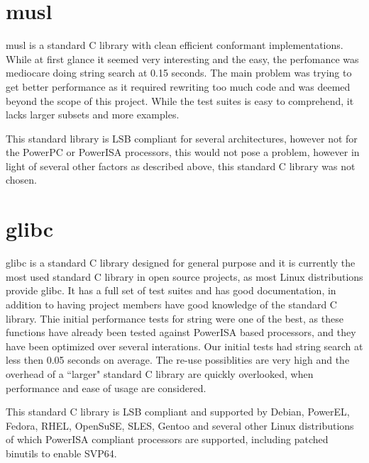 \section{musl}
\label{content:musl}

musl is a standard C library with clean efficient conformant implementations.
While at first glance it seemed very interesting and the easy, the perfomance was mediocare doing string search at 0.15 seconds.
The main problem was trying to get better performance as it required rewriting too much code and was deemed beyond the scope of this project.
While the test suites is easy to comprehend, it lacks larger subsets and more examples.
\par

This standard library is \acrshort{LSB} compliant for several architectures, however not for the PowerPC or PowerISA processors,
this would not pose a problem, however in light of several other factors as described above, this standard C library was not chosen.
\par

\section{glibc}
\label{content:glibc}

glibc is a standard C library designed for general purpose and it is currently the most used standard C library in open source projects,
as most Linux distributions provide glibc.
It has a full set of test suites and has good documentation, in addition to having project members have good knowledge of the standard C library.
Thie initial performance tests for string were one of the best, as these functions have already been tested against PowerISA based processors,
and they have been optimized over several interations.
Our initial tests had string search at less then 0.05 seconds on average.
The re-use possiblities are very high and the overhead of a ``larger" standard C library are quickly overlooked,
when performance and ease of usage are considered.
\par

This standard C library is \acrshort{LSB} compliant and supported by Debian, PowerEL, Fedora, RHEL, OpenSuSE, SLES, Gentoo
and several other Linux distributions of which PowerISA compliant processors are supported, including patched binutils to enable \acrshort{SVP64}.
\par
